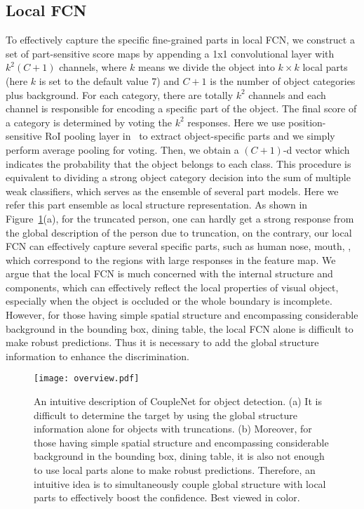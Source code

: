 \documentclass[10pt,twocolumn,letterpaper]{article}
\begin{document}
\subsection{Local FCN}
To effectively capture the specific fine-grained parts in local FCN, we construct a set of part-sensitive score maps by appending a 1x1 convolutional layer with $k^2(C+1)$ channels, where $k$ means we divide the object into $k\times k$ local parts (here $k$ is set to the default value 7) and $C+1$ is the number of object categories plus background. For each category, there are totally $k^2$ channels and each channel is responsible for encoding a specific part of the object. The final score of a category is determined by voting the $k^2$ responses. Here we use position-sensitive RoI pooling layer in~\cite{li2016r} to extract object-specific parts and we simply perform average pooling for voting. Then, we obtain a $(C+1)$-d vector which indicates the probability that the object belongs to each class. This procedure is equivalent to dividing a strong object category decision into the sum of multiple weak classifiers, which serves as the ensemble of several part models. Here we refer this part ensemble as local structure representation. As shown in Figure~\ref{overview}(a), for the truncated person, one can hardly get a strong response from the global description of the person due to truncation, on the contrary, our local FCN can effectively capture several specific parts, such as human nose, mouth, \etc, which correspond to the regions with large responses in the feature map. We argue that the local FCN is much concerned with the internal structure and components, which can effectively reflect the local properties of visual object, especially when the object is occluded or the whole boundary is incomplete. However, for those having simple spatial structure and encompassing considerable background in the bounding box, \eg dining table, the local FCN alone is difficult to make robust predictions. Thus it is necessary to add the global structure information to enhance the discrimination.

\begin{figure}[!t]
\begin{center}
\texttt{[image: overview.pdf]}
\end{center}
  \caption{An intuitive description of CoupleNet for object detection. (a) It is difficult to determine the target by using the global structure information alone for objects with truncations. (b) Moreover,
  for those having simple spatial structure and encompassing considerable background in the bounding box, \eg dining table, it is also not enough to use local parts alone to make robust predictions. Therefore, an intuitive idea is to simultaneously couple global structure with local parts to effectively boost the confidence. Best viewed in color.}
\label{overview}
\end{figure}
\end{document}
